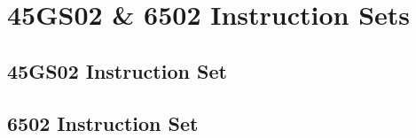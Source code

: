 \chapter{45GS02 \& 6502 Instruction Sets}

\section{45GS02 Instruction Set}



\section{6502 Instruction Set}

